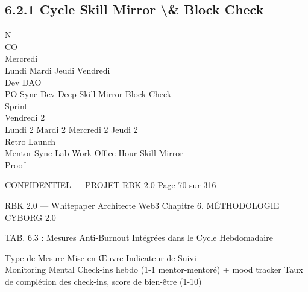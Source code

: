 \subsection{6.2.1 Cycle Skill Mirror \textbackslash{}& Block Check}
\vspace{0.5em}
\vspace{0.5em}
N\\
CO\\
Mercredi\\
Lundi        Mardi                           Jeudi         Vendredi\\
Dev DAO\\
PO Sync     Dev Deep                       Skill Mirror   Block Check\\
Sprint\\
\vspace{0.5em}
\vspace{0.5em}
\vspace{0.5em}
Vendredi 2\\
Lundi 2      Mardi 2       Mercredi 2        Jeudi 2\\
Retro Launch\\
Mentor Sync     Lab Work       Office Hour     Skill Mirror\\
Proof\\
\vspace{0.5em}
\vspace{0.5em}
\vspace{0.5em}
\vspace{0.5em}
\begin{confidential}CONFIDENTIEL — PROJET RBK 2.0                                   Page 70 sur 316\end{confidential}
RBK 2.0 — Whitepaper Architecte Web3                                                                                Chapitre 6. MÉTHODOLOGIE CYBORG 2.0\\
\vspace{0.5em}
\vspace{0.5em}
\begin{center}\begin{tabular}TAB. 6.3 : Mesures Anti-Burnout Intégrées dans le Cycle Hebdomadaire\end{tabular}\end{center}
\vspace{0.5em}
\vspace{0.5em}
Type de Mesure         Mise en Œuvre                                                             Indicateur de Suivi\\
Monitoring Mental      Check-ins hebdo (1-1 mentor-mentoré) + mood tracker                       Taux de complétion des check-ins, score de bien-être (1-10)\\
